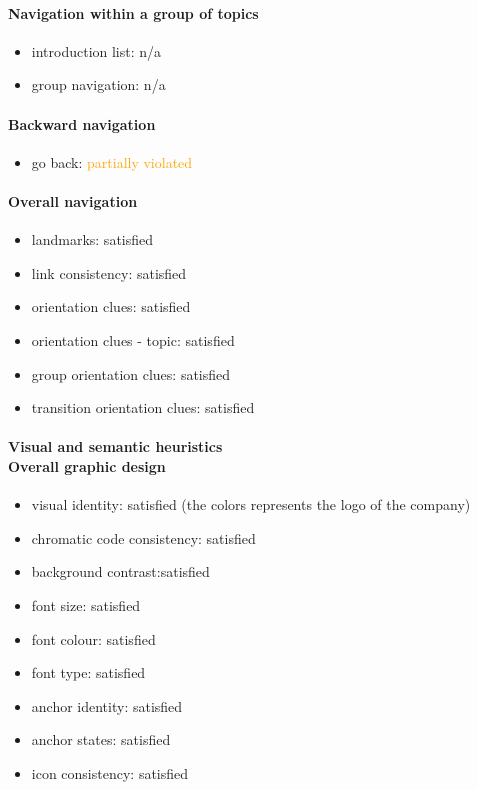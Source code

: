\begin{enumerate}
	\paragraph*{Navigation within a group of topics}
	\begin{itemize}
		\item introduction list: n/a
		\item group navigation: n/a
	\end{itemize}

	\paragraph*{Backward navigation}
	\begin{itemize}
		\item go back: \textcolor{orange}{partially violated}
	\end{itemize}

	\paragraph*{Overall navigation}
	\begin{itemize}
		\item landmarks: satisfied
		\item link consistency: satisfied
		\item orientation clues: satisfied
		\item orientation clues - topic: satisfied
		\item group orientation clues: satisfied
		\item transition orientation clues: satisfied
	\end{itemize}	

	\paragraph*{Visual and semantic heuristics \\ Overall graphic design }
	\begin{itemize}
		\item visual identity: satisfied (the colors represents the logo of the company)
		\item chromatic code consistency: satisfied
		\item background contrast:satisfied
		\item font size: satisfied
		\item font colour: satisfied
		\item font type: satisfied
		\item anchor identity: satisfied
		\item anchor states: satisfied
		\item icon consistency: satisfied
	\end{itemize}


\end{enumerate}
